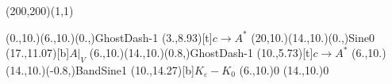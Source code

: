 \unitlength=1bp%

\begin{feynartspicture}(200,200)(1,1)

\FADiagram{}
\FAProp(0.,10.)(6.,10.)(0.,){GhostDash}{-1}
\FALabel(3.,8.93)[t]{$c\to A^*$}
\FAProp(20,10.)(14.,10.)(0.,){Sine}{0}
\FALabel(17.,11.07)[b]{$A|_V$}
\FAProp(6.,10.)(14.,10.)(0.8,){GhostDash}{-1}
\FALabel(10.,5.73)[t]{$c\to A^*$}
\FAProp(6.,10.)(14.,10.)(-0.8,){BandSine}{1}
\FALabel(10.,14.27)[b]{$K_\varepsilon-K_0$}
\FAVert(6.,10.){0}
\FAVert(14.,10.){0}
\end{feynartspicture}

